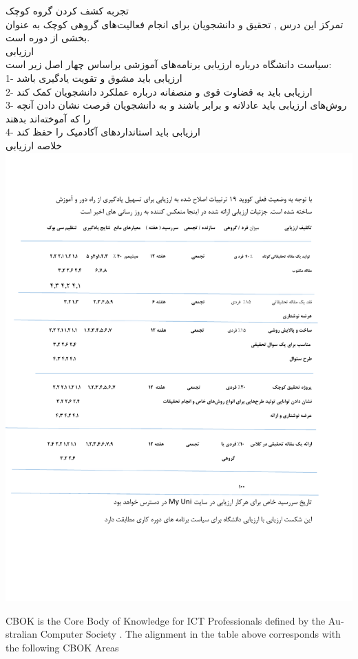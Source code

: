 \documentclass[a4 paper,12pt]{article}\usepackage{float, graphicx,xepersian }
\begin{document}
\noindent 
 تجربه کشف کردن گروه کوچک\\
 تمرکز این درس , تحقیق و دانشجویان برای انجام فعالیت‌های گروهی کوچک به عنوان بخشی از دوره است. \\
 ارزیابی\\
 سیاست دانشگاه درباره ارزیابی برنامه‌های آموزشی براساس چهار اصل زیر است: \\
 1- ارزیابی باید مشوق و تقویت یادگیری باشد\\
 2- ارزیابی باید به قضاوت قوی و منصفانه درباره عملکرد دانشجویان کمک کند\\ 
 3- روش‌های ارزیابی باید عادلانه و برابر باشند و به دانشجویان فرصت نشان دادن آنچه را که آموخته‌اند بدهند \\
 4- ارزیابی باید استانداردهای آکادمیک را حفظ کند \\
 خلاصه ارزیابی \\
 	\includegraphics[scale=0.45]{arz.pdf}
\begin{latin} 	 
\noindent	
 CBOK is the Core Body of Knowledge for ICT Professionals defined by the Australian Computer Society . The alignment in the table above corresponds with the following CBOK Areas
 \end{latin}
\end{document}
